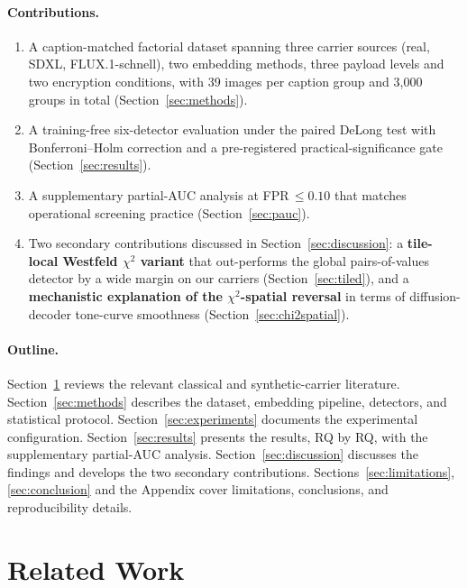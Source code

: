 \documentclass[10pt,twocolumn,a4paper]{article}
\begin{document}
\paragraph{Contributions.}
\begin{enumerate}
\item A caption-matched factorial dataset spanning three carrier sources (real, SDXL, FLUX.1-schnell), two embedding methods, three payload levels and two encryption conditions, with 39 images per caption group and 3{,}000 groups in total (Section~\ref{sec:methods}).
\item A training-free six-detector evaluation under the paired DeLong test with Bonferroni--Holm correction and a pre-registered practical-significance gate (Section~\ref{sec:results}).
\item A supplementary partial-AUC analysis at FPR\,$\leq\!0.10$ that matches operational screening practice (Section~\ref{sec:pauc}).
\item Two secondary contributions discussed in Section~\ref{sec:discussion}: a \textbf{tile-local Westfeld $\chi^2$ variant} that out-performs the global pairs-of-values detector by a wide margin on our carriers (Section~\ref{sec:tiled}), and a \textbf{mechanistic explanation of the $\chi^2$-spatial reversal} in terms of diffusion-decoder tone-curve smoothness (Section~\ref{sec:chi2spatial}).
\end{enumerate}

\paragraph{Outline.} Section~\ref{sec:relatedwork} reviews the relevant classical and synthetic-carrier literature. Section~\ref{sec:methods} describes the dataset, embedding pipeline, detectors, and statistical protocol. Section~\ref{sec:experiments} documents the experimental configuration. Section~\ref{sec:results} presents the results, RQ by RQ, with the supplementary partial-AUC analysis. Section~\ref{sec:discussion} discusses the findings and develops the two secondary contributions. Sections~\ref{sec:limitations}, \ref{sec:conclusion} and the Appendix cover limitations, conclusions, and reproducibility details.

\section{Related Work}
\label{sec:relatedwork}
\end{document}
